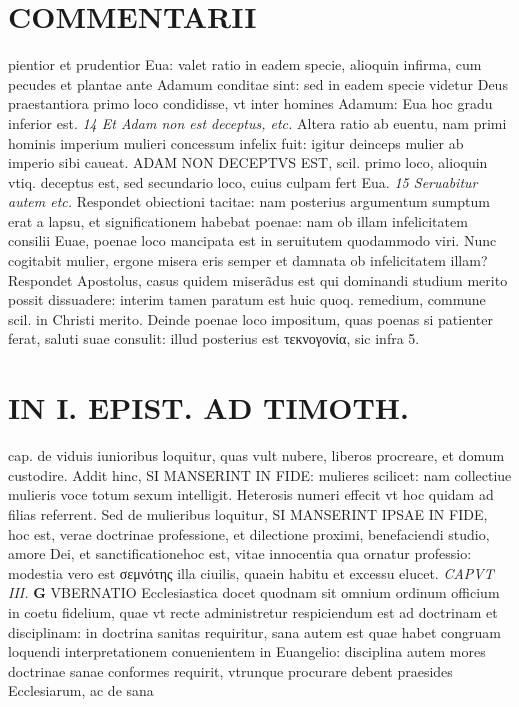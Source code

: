 \documentclass{article}
\begin{document}
\begin{pages}
\section*{COMMENTARII }
\marginpar{[ p.58 ]}\pstart pientior et prudentior Eua: valet ratio in eadem specie, alioquin infirma, cum pecudes et plantae ante Adamum conditae sint: sed in eadem specie videtur Deus praestantiora primo loco condidisse, vt inter homines Adamum: Eua hoc gradu inferior est.  \pend
\textit{14 Et Adam non est deceptus, etc. }\pstart Altera ratio ab euentu, nam primi hominis imperium mulieri concessum infelix fuit: igitur deinceps mulier ab imperio sibi caueat. ADAM NON DECEPTVS EST, scil. primo loco, alioquin vtiq. deceptus est, sed secundario loco, cuius culpam fert Eua.  \pend
\textit{15 Seruabitur autem etc. }\pstart Respondet obiectioni tacitae: nam posterius argumentum sumptum erat a lapsu, et significationem habebat poenae: nam ob illam infelicitatem consilii Euae, poenae loco mancipata est in seruitutem quodammodo viri. Nunc cogitabit mulier, ergone misera eris semper et damnata ob infelicitatem illam? Respondet Apostolus, casus quidem miserãdus est qui dominandi studium merito possit dissuadere: interim tamen paratum est huic quoq. remedium, commune scil. in Christi merito. Deinde poenae loco impositum, quas poenas si patienter ferat, saluti suae consulit: illud posterius est τεκνογονία, sic infra 5.  \pend
\section*{IN I. EPIST. AD TIMOTH. }
\marginpar{[ p.59 ]}\pstart cap. de viduis iunioribus loquitur, quas vult nubere, liberos procreare, et domum custodire. Addit hinc, SI MANSERINT IN FIDE: mulieres scilicet: nam collectiue mulieris voce totum sexum intelligit. Heterosis numeri effecit vt hoc quidam ad filias referrent. Sed de mulieribus loquitur, SI MANSERINT IPSAE IN FIDE, hoc est, verae doctrinae professione, et dilectione proximi, benefaciendi studio, amore Dei, et sanctificationehoc est, vitae innocentia qua ornatur professio: modestia vero est σεμνότης illa ciuilis, quaein habitu et excessu elucet.  \pend
\textit{CAPVT III. }
\textbf{G }\pstart VBERNATIO Ecclesiastica docet quodnam sit omnium ordinum officium in coetu fidelium, quae vt recte administretur respiciendum est ad doctrinam et disciplinam: in doctrina sanitas requiritur, sana autem est quae habet congruam loquendi interpretationem conuenientem in Euangelio: disciplina autem mores doctrinae sanae conformes requirit, vtrunque procurare debent praesides Ecclesiarum, ac de sana  \pend

\end{pages}
\end{document}
